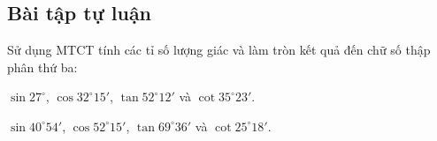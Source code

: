 \subsection{Bài tập tự luận}
\begin{bt}
	Sử dụng MTCT tính các tỉ số lượng giác và làm tròn kết quả đến chữ số thập phân thứ ba:
	\begin{listEX}[2]
	\item
	$\sin 27^\circ$, 
	$\cos 32^\circ 15'$, 
	$\tan 52^\circ 12'$ 
	và $\cot 35^\circ 23'$.
	\item
	$\sin 40^\circ 54'$,
	$\cos 52^\circ 15'$,
	$\tan 69^\circ 36'$
	và $\cot 25^\circ 18'$.
	\end{listEX}
	\loigiai{
	}
\end{bt}
